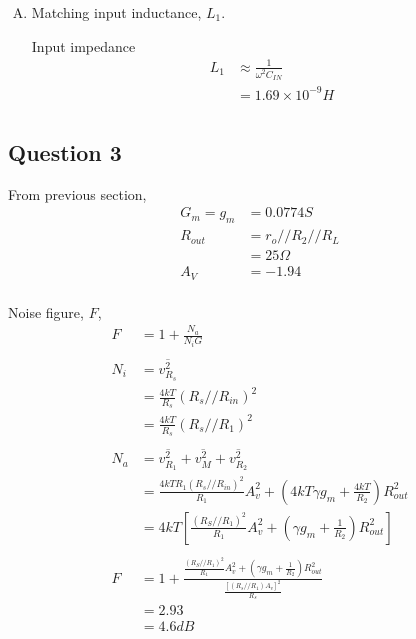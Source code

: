 \documentclass{article}
\begin{document}
\begin{enumerate}[A.]
\item Matching input inductance, \(L_{1}\).

Input impedance
\begin{equation*}
\begin{aligned}
L_{1} &\approx \frac{1}{\omega^2C_{IN}} \\
&= 1.69 \times 10^{-9} H \\
\end{aligned}
\end{equation*}
\end{enumerate}

\subsection{Question 3}
\label{sec:org7606ebc}
From previous section,
\begin{equation*}
\begin{aligned}
G_{m} = g_{m} &= 0.0774 S \\
R_{out} &= r_{o} // R_{2} // R_{L} \\
&= 25 \Omega \\
A_{V} &= -1.94 \\
\end{aligned}
\end{equation*}

Noise figure, \(F\),
\begin{equation*}
\begin{aligned}
F &= 1 + \frac{N_{a}}{N_{i}G} \\
\\
N_{i} &= \overline{v_{R_{s}}^{2}} \\
&= \frac{4kT}{R_{s}}(R_{s} // R_{in})^{2} \\
&= \frac{4kT}{R_{s}}(R_{s} // R_{1})^{2} \\
\\
N_{a} &= \overline{v_{R_{1}}^{2}} + \overline{v_{M}^{2}} + \overline{v_{R_{2}}^{2}} \\
&= \frac{4kTR_{1}(R_{s} // R_{in})^{2}}{R_{1}}A_{v}^{2} + (4kT\gamma{}g_{m} + \frac{4kT}{R_{2}})R_{out}^{2} \\
&= 4kT[\frac{(R_{S} // R_{1})^{2}}{R_{1}}A_{v}^{2} + (\gamma{}g_{m} + \frac{1}{R_{2}})R_{out}^{2}] \\
\\
F &= 1 + \frac{\frac{(R_{S} // R_{1})^{2}}{R_{1}}A_{v}^{2} + (\gamma{}g_{m} + \frac{1}{R_{2}})R_{out}^{2}}{\frac{[(R_{s} // R_{1})A_{v}]^{2}}{R_{s}}} \\
&= 2.93 \\
&= 4.6 dB \\

\end{aligned}
\end{equation*}
\end{document}
